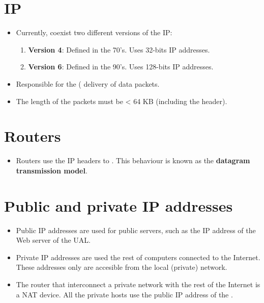 \section{\gls{IP}}
\begin{itemize}
\item Currently, coexist two different versions of the IP:
  \begin{enumerate}
  \item \textbf{Version 4}: Defined in the 70's. Uses 32-bits IP addresses.
  \item \textbf{Version 6}: Defined in the 90's. Uses 128-bits IP addresses.
  \end{enumerate}
\item Responsible for the ( delivery of data packets.
\item The length of the packets must be < 64 KB (including the header).
\end{itemize}

\section{Routers}
\begin{itemize} 
\item Routers use the IP headers to . This behaviour is known as the \textbf{datagram
    transmission model}.
\end{itemize}

\section{Public and private IP addresses}
\begin{itemize}
\item Public IP addresses are used for public servers, such as the IP
  address of the Web server of the UAL.
\item Private IP addresses are used the rest of computers connected to
  the Internet. These addresses only are accesible from the local
  (private) network.
\item The router that interconnect a private network with the rest of
  the Internet is a \gls{NAT} device. All the private hosts use the
  public IP address of the .
\end{itemize}

